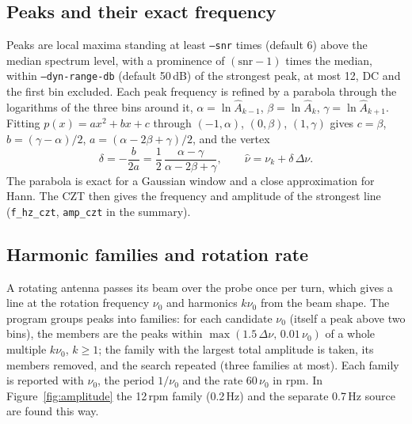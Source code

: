 \documentclass[10pt,letterpaper]{article}
\numberwithin{equation}{section}
\begin{document}
\subsection{Peaks and their exact frequency}
Peaks are local maxima standing at least \texttt{--snr} times (default 6) above
the median spectrum level, with a prominence of $(\mathrm{snr}-1)$ times the
median, within \texttt{--dyn-range-db} (default 50\,dB) of the strongest peak,
at most 12, DC and the first bin excluded. Each peak frequency is refined by a
parabola through the logarithms of the three bins around it,
$\alpha = \ln\hat{A}_{k-1}$, $\beta = \ln\hat{A}_k$, $\gamma = \ln\hat{A}_{k+1}$.
Fitting $p(x) = a x^2 + bx + c$ through $(-1,\alpha)$, $(0,\beta)$,
$(1,\gamma)$ gives $c = \beta$, $b = (\gamma-\alpha)/2$,
$a = (\alpha - 2\beta + \gamma)/2$, and the vertex
\begin{equation}
\delta = -\frac{b}{2a} = \frac{1}{2}\,\frac{\alpha - \gamma}{\alpha - 2\beta + \gamma},
\qquad \hat{\nu} = \nu_k + \delta\,\Delta\nu .
\end{equation}
The parabola is exact for a Gaussian window and a close approximation for
Hann. The CZT then gives the frequency and amplitude of the strongest line
(\texttt{f\_hz\_czt}, \texttt{amp\_czt} in the summary).

\subsection{Harmonic families and rotation rate}
A rotating antenna passes its beam over the probe once per turn, which gives a
line at the rotation frequency $\nu_0$ and harmonics $k\nu_0$ from the beam shape.
The program groups peaks into families: for each candidate $\nu_0$ (itself a
peak above two bins), the members are the peaks within
$\max(1.5\,\Delta\nu,\,0.01\,\nu_0)$ of a whole multiple $k\nu_0$, $k\ge1$; the
family with the largest total amplitude is taken, its members removed, and
the search repeated (three families at most). Each family is reported with
$\nu_0$, the period $1/\nu_0$ and the rate $60\,\nu_0$ in rpm. In
Figure~\ref{fig:amplitude} the 12\,rpm family (0.2\,Hz) and the separate
0.7\,Hz source are found this way.
\end{document}

